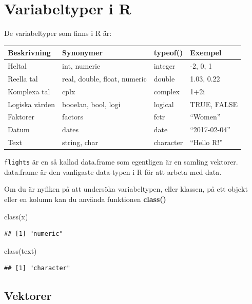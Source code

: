 \documentclass[
]{book}
\newenvironment{Shaded}{\begin{snugshade}}{\end{snugshade}}
\newcommand{\FunctionTok}[1]{\textcolor[rgb]{0.00,0.00,0.00}{#1}}
\newcommand{\NormalTok}[1]{#1}
\begin{document}
\hypertarget{variabeltyper-i-r}{%
\section{Variabeltyper i R}\label{variabeltyper-i-r}}

De variabeltyper som finns i R är:

\begin{longtable}[]{@{}llll@{}}
\toprule
Beskrivning & Synonymer & typeof() & Exempel\tabularnewline
\midrule
\endhead
Heltal & int, numeric & integer & -2, 0, 1\tabularnewline
Reella tal & real, double, float, numeric & double & 1.03, 0.22\tabularnewline
Komplexa tal & cplx & complex & 1+2i\tabularnewline
Logiska värden & booelan, bool, logi & logical & TRUE, FALSE\tabularnewline
Faktorer & factors & fctr & ``Women''\tabularnewline
Datum & dates & date & ``2017-02-04''\tabularnewline
Text & string, char & character & ``Hello R!''\tabularnewline
\bottomrule
\end{longtable}

\texttt{flights} är en så kallad data.frame som egentligen är en samling vektorer. data.frame är den vanligaste data-typen i R för att arbeta med data.

Om du är nyfiken på att undersöka variabeltypen, eller klassen, på ett objekt eller en kolumn kan du använda funktionen \textbf{class()}

\begin{Shaded}
\begin{Highlighting}[]
\FunctionTok{class}\NormalTok{(x)}
\end{Highlighting}
\end{Shaded}

\begin{verbatim}
## [1] "numeric"
\end{verbatim}

\begin{Shaded}
\begin{Highlighting}[]
\FunctionTok{class}\NormalTok{(text)}
\end{Highlighting}
\end{Shaded}

\begin{verbatim}
## [1] "character"
\end{verbatim}

\hypertarget{vektorer}{%
\subsection{Vektorer}\label{vektorer}}
\end{document}
